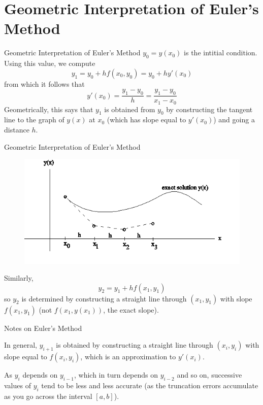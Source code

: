 \documentclass[12pt]{beamer}
\begin{document}
\section{Geometric Interpretation of Euler's Method}

\begin{frame}{Geometric Interpretation of Euler's Method}
$y_0=y(x_0)$ is the intitial condition. Using this value, we compute
\[
y_1=y_0+hf(x_0,y_0)=y_0+hy'(x_0)
\]
from which it follows that
\[
y'(x_0)=\frac{y_1-y_0}{h}=\frac{y_1-y_0}{x_1-x_0}
\]
Geometrically, this says that $y_1$ is obtained from $y_0$ by constructing the tangent line to the graph of $y(x)$ at $x_0$ (which has slope equal to $y'(x_0)$) and going a distance $h$.

\end{frame}

\begin{frame}{Geometric Interpretation of Euler's Method}

\begin{figure}[h] 
  \centering
  \includegraphics[scale=0.65]{eulers}
  \label{fig:eulers}
\end{figure}

Similarly,
\[
y_2=y_1+hf(x_1,y_1)
\]
so $y_2$ is determined by constructing a straight line through $(x_1,y_1)$ with slope $f(x_1,y_1)$ (not $f(x_1,y(x_1))$, the exact slope).  

\end{frame}

\begin{frame}{Notes on Euler's Method}

In general, $y_{i+1}$ is obtained by constructing a straight line through $(x_i,y_i)$ with slope equal to $f(x_i,y_i)$, which is an approximation to $y'(x_i)$.

\vspace{\baselineskip}

As $y_i$ depends on $y_{i-1}$, which in turn depends on $y_{i-2}$ and so on, successive values of $y_i$ tend to be less and less accurate (as the truncation errors accumulate as you go across the interval $[a,b]$).

\end{frame}
\end{document}
